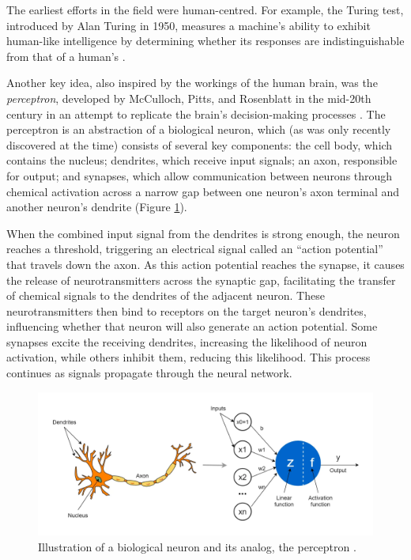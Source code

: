 The earliest efforts in the field were human-centred. For example, the Turing test, introduced by Alan Turing in 1950, measures a machine’s ability to exhibit human-like intelligence by determining whether its responses are indistinguishable from that of a human’s \cite{turing_computing_1950}. 

Another key idea, also inspired by the workings of the human brain, was the \textit{perceptron}, developed by McCulloch, Pitts, and Rosenblatt in the mid-20th century in an attempt to replicate the brain's decision-making processes \cite{mcculloch_logical_1943, rosenblatt_perceptron_1958}. The perceptron is an abstraction of a biological neuron, which (as was only recently discovered at the time) consists of several key components: the cell body, which contains the nucleus; dendrites, which receive input signals; an axon, responsible for output; and synapses, which allow communication between neurons through chemical activation across a narrow gap between one neuron's axon terminal and another neuron's dendrite (Figure \ref{fig:biological-neuron}). 

When the combined input signal from the dendrites is strong enough, the neuron reaches a threshold, triggering an electrical signal called an ``action potential'' that travels down the axon. As this action potential reaches the synapse, it causes the release of neurotransmitters across the synaptic gap, facilitating the transfer of chemical signals to the dendrites of the adjacent neuron. These neurotransmitters then bind to receptors on the target neuron's dendrites, influencing whether that neuron will also generate an action potential. Some synapses excite the receiving dendrites, increasing the likelihood of neuron activation, while others inhibit them, reducing this likelihood. This process continues as signals propagate through the neural network.

\begin{figure}[htbp]
    \centering
    \includegraphics[width=\textwidth]{img/ch1/neuron.png}
    \caption{Illustration of a biological neuron and its analog, the perceptron \cite{pramoditha_concept_2021}.}
    \label{fig:biological-neuron}
\end{figure}

